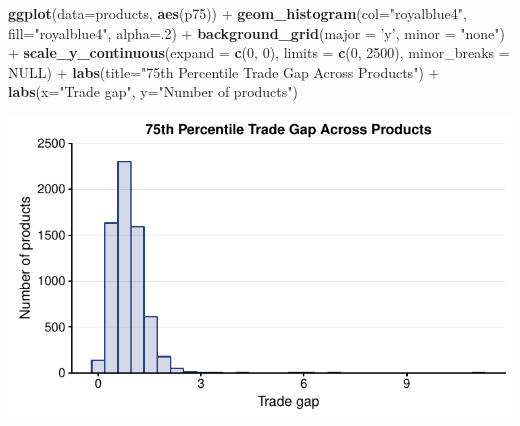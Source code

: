 \documentclass[10pt,]{article}
\newenvironment{Shaded}{\begin{snugshade}}{\end{snugshade}}
\newcommand{\KeywordTok}[1]{\textcolor[rgb]{0.13,0.29,0.53}{\textbf{{#1}}}}
\newcommand{\DataTypeTok}[1]{\textcolor[rgb]{0.13,0.29,0.53}{{#1}}}
\newcommand{\DecValTok}[1]{\textcolor[rgb]{0.00,0.00,0.81}{{#1}}}
\newcommand{\StringTok}[1]{\textcolor[rgb]{0.31,0.60,0.02}{{#1}}}
\newcommand{\OtherTok}[1]{\textcolor[rgb]{0.56,0.35,0.01}{{#1}}}
\newcommand{\NormalTok}[1]{{#1}}
\begin{document}
\begin{Shaded}
\begin{Highlighting}[]
\KeywordTok{ggplot}\NormalTok{(}\DataTypeTok{data=}\NormalTok{products, }\KeywordTok{aes}\NormalTok{(p75)) +}
\StringTok{  }\KeywordTok{geom_histogram}\NormalTok{(}\DataTypeTok{col=}\StringTok{"royalblue4"}\NormalTok{,}
                 \DataTypeTok{fill=}\StringTok{"royalblue4"}\NormalTok{,}
                 \DataTypeTok{alpha=}\NormalTok{.}\DecValTok{2}\NormalTok{) +}
\StringTok{  }\KeywordTok{background_grid}\NormalTok{(}\DataTypeTok{major =} \StringTok{'y'}\NormalTok{, }\DataTypeTok{minor =} \StringTok{"none"}\NormalTok{) +}
\StringTok{  }\KeywordTok{scale_y_continuous}\NormalTok{(}\DataTypeTok{expand =} \KeywordTok{c}\NormalTok{(}\DecValTok{0}\NormalTok{, }\DecValTok{0}\NormalTok{),  }\DataTypeTok{limits =} \KeywordTok{c}\NormalTok{(}\DecValTok{0}\NormalTok{, }\DecValTok{2500}\NormalTok{), }\DataTypeTok{minor_breaks =} \OtherTok{NULL}\NormalTok{) +}
\StringTok{  }\KeywordTok{labs}\NormalTok{(}\DataTypeTok{title=}\StringTok{"75th Percentile Trade Gap Across Products"}\NormalTok{) +}
\StringTok{  }\KeywordTok{labs}\NormalTok{(}\DataTypeTok{x=}\StringTok{"Trade gap"}\NormalTok{, }\DataTypeTok{y=}\StringTok{"Number of products"}\NormalTok{)}
\end{Highlighting}
\end{Shaded}

\begin{center}\includegraphics{Figs/value_time-5} \end{center}
\end{document}
